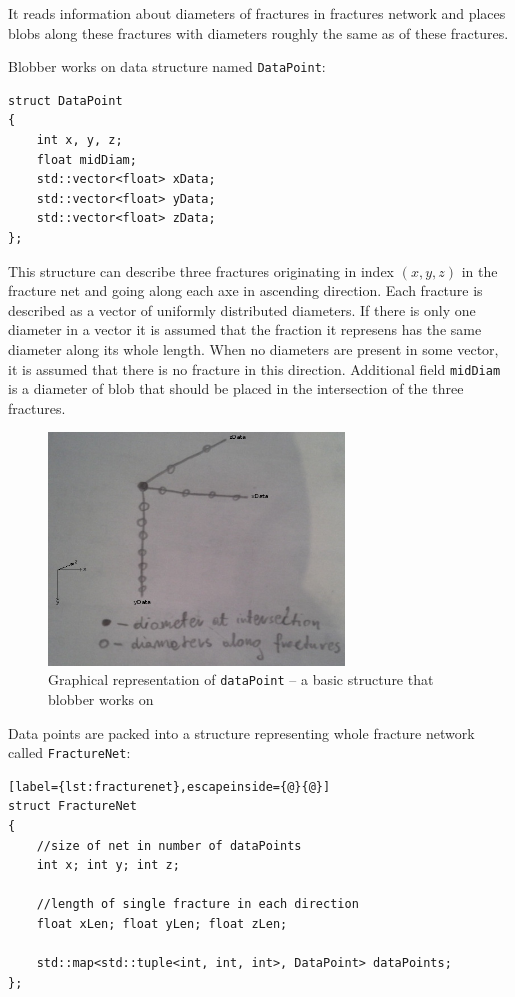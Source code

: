 It reads information about diameters of fractures in fractures network
and places blobs along these fractures with diameters roughly the same as of
these fractures.

Blobber works on data structure named \texttt{DataPoint}:

\begin{lstlisting}
struct DataPoint
{
  	int x, y, z;
	float midDiam;
	std::vector<float> xData;
	std::vector<float> yData;
	std::vector<float> zData;
};
\end{lstlisting}

This structure can describe three fractures originating in index $(x,y,z)$ in
the fracture net and going along each axe in ascending direction. Each fracture
is described as a vector of uniformly distributed diameters. If there is only
one diameter in a vector it is assumed that the fraction it represens has the
same diameter along its whole length. When no diameters are present in some
vector, it is assumed that there is no fracture in this direction.
Additional field \texttt{midDiam} is a diameter of blob that should be placed in
the intersection of the three fractures.

\begin{figure}[hb]
  \begin{center}
    \includegraphics[width=0.7\textwidth]{chapters/project/datapoint.jpg}
  \end{center}
  \caption{Graphical representation of \texttt{dataPoint} -- a basic structure that
blobber works on}
  \label{fig:datapoint}
\end{figure}

Data points are packed into a structure representing whole fracture network
called \texttt{FractureNet}:
\begin{lstlisting}[label={lst:fracturenet},escapeinside={@}{@}]
struct FractureNet
{
	//size of net in number of dataPoints
	int x; int y; int z;
	
	//length of single fracture in each direction
	float xLen; float yLen; float zLen;
	
	std::map<std::tuple<int, int, int>, DataPoint> dataPoints;
};
\end{lstlisting}

